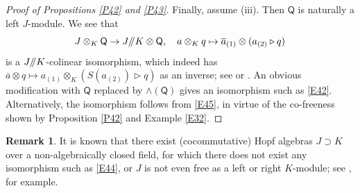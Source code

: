 \documentclass[11pt, a4paper]{amsart}
\theoremstyle{definition}
\newtheorem{rem}[theorem]{Remark}
\numberwithin{equation}{section}
\begin{document}
\begin{proof}[Proof of Propositions \ref{P42} and \ref{P43}]
Finally, assume (iii). Then $\mathsf{Q}$ is naturally a left $J$-module. 
We see that
\begin{equation}\label{E45}
J \otimes_{K} \mathsf{Q} \to J/\hspace{-1mm}/K \otimes \mathsf{Q},\quad a \otimes_{K} q \mapsto \overline{a}_{(1)} \otimes (a_{(2)} \triangleright q)
\end{equation}
is a $J/\hspace{-1mm}/K$-colinear isomorphism, which indeed has $\overline{a} \otimes q \mapsto a_{(1)} \otimes_{K} (S(a_{(2)}) \triangleright q)$ as an inverse; see \cite[p.456, line 6]{T} or \cite[Eq. (4)]{M1}. 
An obvious modification with $\mathsf{Q}$ replaced by $\wedge(\mathsf{Q})$
gives an isomorphism such as \eqref{E42}. Alternatively, the isomorphism follows from \eqref{E45}, in virtue of
the co-freeness shown by Proposition \ref{P42} and Example \ref{E32}. 
\end{proof}

\begin{rem}
It is known that there exist (cocommutative) Hopf algebras $J\supset K$ over a non-algebraically closed field,
for which there does not exist any 
isomorphism such as \eqref{E44}, or $J$ is not even free as a left or right $K$-module; see \cite[Sect. 5]{T}, for example.
\end{rem}
\end{document}
